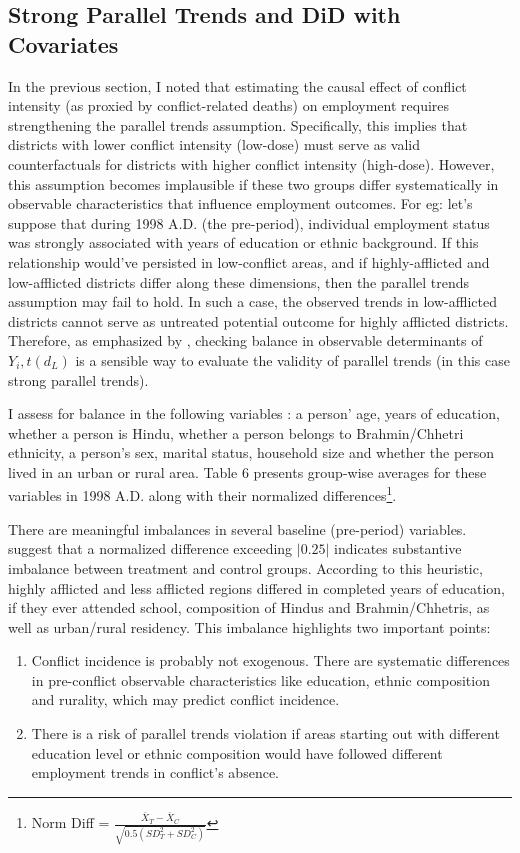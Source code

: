 \documentclass[12pt,a4paper]{article}
\begin{document}
\subsection{Strong Parallel Trends and DiD with Covariates}
In the previous section, I noted that estimating the causal effect of conflict intensity (as proxied by conflict-related deaths) on employment requires strengthening the parallel trends assumption. Specifically, this implies that districts with lower conflict intensity (low-dose) must serve as valid counterfactuals for districts with higher conflict intensity (high-dose). However, this assumption becomes implausible if these two groups differ systematically in observable characteristics that influence employment outcomes. For eg: let's suppose that during 1998 A.D. (the pre-period), individual employment status was strongly associated with years of education or ethnic background. If this relationship would've persisted in low-conflict areas, and if highly-afflicted and low-afflicted districts differ along these dimensions, then the parallel trends assumption may fail to hold. In such a case, the observed trends in low-afflicted districts cannot serve as untreated potential outcome for highly afflicted districts. Therefore, as emphasized by \parencite{baker2025difference}, checking balance in observable determinants of $Y_i,t(d_L)$ is a sensible way to evaluate the validity of parallel trends (in this case strong parallel trends).

I assess for balance in the following variables : a person' age, years of education, whether a person is Hindu, whether a person belongs to Brahmin/Chhetri ethnicity, a person's sex, marital status, household size and whether the person lived in an urban or rural area. Table 6 presents group-wise averages for these variables in 1998 A.D. along with their normalized differences\footnote{Norm Diff = $\frac{{\bar{X}_{T}-\bar{X}_{C}}}{\sqrt{0.5(SD_{T}^{2}+SD_{C}^{2})}}$}.



There are meaningful imbalances in several baseline (pre-period) variables. \textcite{imbens2015causal} suggest that a normalized difference exceeding $|0.25|$ indicates substantive imbalance between treatment and control groups. According to this heuristic, highly afflicted and less afflicted regions differed in completed years of education, if they ever attended school, composition of Hindus and Brahmin/Chhetris, as well as urban/rural residency. This imbalance highlights two important points:	
\begin{enumerate}
	\item Conflict incidence is probably not exogenous. There are systematic differences in pre-conflict observable characteristics like education, ethnic composition and rurality, which may predict conflict incidence.
	
	\item There is a risk of parallel trends violation if areas starting out with different education level or ethnic composition would have followed different employment trends in conflict's absence.
\end{enumerate}
\end{document}
